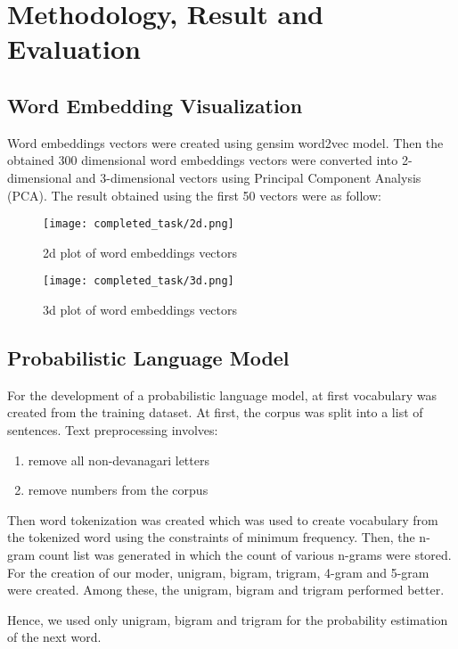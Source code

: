 \chapter{Methodology, Result and Evaluation}
\section{Word Embedding Visualization}
Word embeddings vectors were created using gensim word2vec model. Then the obtained 300 dimensional word embeddings vectors were converted into 2-dimensional and 3-dimensional vectors using Principal Component Analysis (PCA). The result obtained using the first 50 vectors were as follow:

\begin{figure}[H]
	\centering
	\texttt{[image: completed\_task/2d.png]}
	\caption{2d plot of word embeddings vectors}
	\label{fig:2d plot of word embeddings vectors}
\end{figure}

\begin{figure}[H]
	\centering
	\texttt{[image: completed\_task/3d.png]}
	\caption{3d plot of word embeddings vectors}
	\label{fig:3d plot of word embeddings vectors}
\end{figure}


\section{Probabilistic Language Model}
For the development of a probabilistic language model, at first vocabulary was created from the training dataset. At first, the corpus was split into a list of sentences. Text preprocessing involves:

\begin{enumerate}
    \item remove all non-devanagari letters
    \item remove numbers from the corpus
\end{enumerate}


Then word tokenization was created which was used to create vocabulary from the tokenized word using the constraints of minimum frequency. Then, the n-gram count list was generated in which the count of various n-grams were stored. For the creation of our moder, unigram, bigram, trigram, 4-gram and 5-gram were created. Among these, the unigram, bigram and trigram performed better. 

Hence, we used only unigram, bigram and trigram for the probability estimation of the next word.

